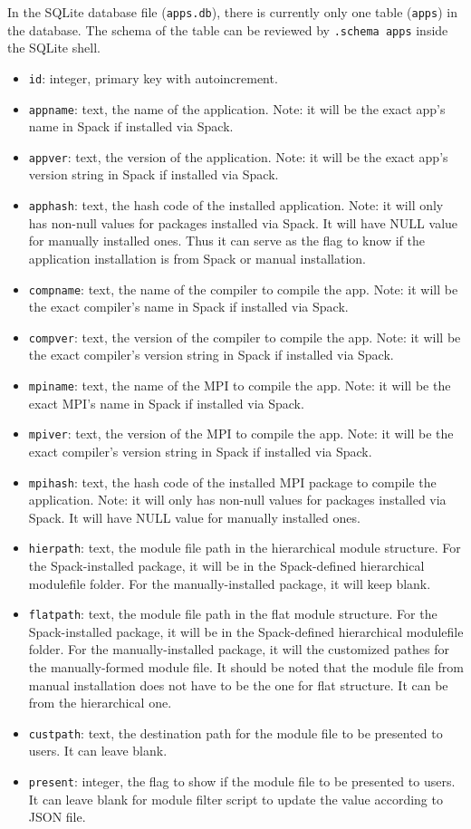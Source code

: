 \documentclass[conference]{IEEEtran}
\begin{document}
In the SQLite database file (\verb|apps.db|), there is currently only one table (\verb|apps|) in the database. The schema of the table can be reviewed by \verb|.schema apps| inside the SQLite shell. 

\begin{itemize}
    \item \verb|id|: integer, primary key with autoincrement.
    \item \verb|appname|: text, the name of the application. Note: it will be the exact app's name in Spack if installed via Spack.
    \item \verb|appver|: text, the version of the application. Note: it will be the exact app's version string in Spack if installed via Spack.
    \item \verb|apphash|: text, the hash code of the installed application. Note: it will only has non-null values for packages installed via Spack. It will have NULL value for manually installed ones. Thus it can serve as the flag to know if the application installation is from Spack or manual installation.
    \item \verb|compname|: text, the name of the compiler to compile the app. Note: it will be the exact compiler's name in Spack if installed via Spack.
    \item \verb|compver|: text, the version of the compiler to compile the app. Note: it will be the exact compiler's version string in Spack if installed via Spack.
    \item \verb|mpiname|: text, the name of the MPI to compile the app. Note: it will be the exact MPI's name in Spack if installed via Spack.
    \item \verb|mpiver|: text, the version of the MPI to compile the app. Note: it will be the exact compiler's version string in Spack if installed via Spack.
    \item \verb|mpihash|: text, the hash code of the installed MPI package to compile the application. Note: it will only has non-null values for packages installed via Spack. It will have NULL value for manually installed ones.
    \item \verb|hierpath|: text, the module file path in the hierarchical module structure. For the Spack-installed package, it will be in the Spack-defined hierarchical modulefile folder. For the manually-installed package, it will keep blank.
    \item \verb|flatpath|: text, the module file path in the flat module structure. For the Spack-installed package, it will be in the Spack-defined hierarchical modulefile folder. For the manually-installed package, it will the customized pathes for the manually-formed module file. It should be noted that the module file from manual installation does not have to be the one for flat structure. It can be from the hierarchical one.
    \item \verb|custpath|: text, the destination path for the module file to be presented to users. It can leave blank.
    \item \verb|present|: integer, the flag to show if the module file to be presented to users. It can leave blank for module filter script to update the value according to JSON file.


\end{itemize}
\end{document}
